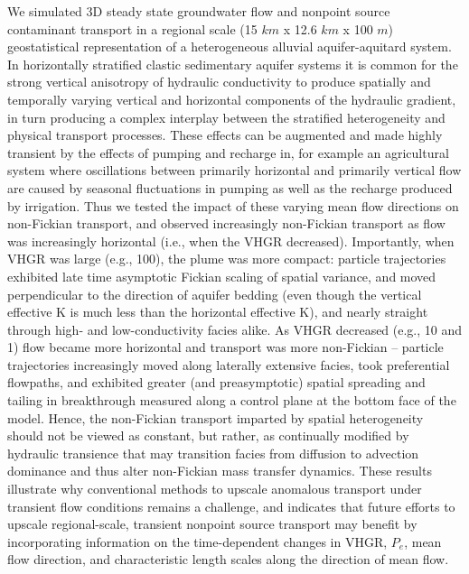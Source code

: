 We simulated 3D steady state groundwater flow and nonpoint source contaminant transport in a regional scale (15 $km$ x 12.6 $km$ x 100 $m$) geostatistical representation of a heterogeneous alluvial aquifer-aquitard system. In horizontally stratified clastic sedimentary aquifer systems it is common for the strong vertical anisotropy of hydraulic conductivity to produce spatially and temporally varying vertical and horizontal components of the hydraulic gradient, in turn producing a complex interplay between the stratified heterogeneity and physical transport processes. These effects can be augmented and made highly transient by the effects of pumping and recharge in, for example an agricultural system where oscillations between primarily horizontal and primarily vertical flow are caused by seasonal fluctuations in pumping as well as the recharge produced by irrigation. Thus we tested the impact of these varying mean flow directions on non-Fickian transport, and observed increasingly non-Fickian transport as flow was increasingly horizontal (i.e., when the VHGR decreased). Importantly, when VHGR was large (e.g., 100), the plume was more compact: particle trajectories exhibited late time asymptotic Fickian scaling of spatial variance, and moved perpendicular to the direction of aquifer bedding (even though the vertical effective K is much less than the horizontal effective K), and nearly straight through high- and low-conductivity facies alike. As VHGR decreased (e.g., 10 and 1) flow became more horizontal and transport was more non-Fickian -- particle trajectories increasingly moved along laterally extensive facies, took preferential flowpaths, and exhibited greater (and preasymptotic) spatial spreading and tailing in breakthrough measured along a control plane at the bottom face of the model. Hence, the non-Fickian transport imparted by spatial heterogeneity should not be viewed as constant, but rather, as continually modified by hydraulic transience that may transition facies from diffusion to advection dominance and thus alter non-Fickian mass transfer dynamics. These results illustrate why conventional methods to upscale anomalous transport under transient flow conditions remains a challenge, and indicates that future efforts to upscale regional-scale, transient nonpoint source transport may benefit by incorporating information on the time-dependent changes in VHGR, $P_e$, mean flow direction, and characteristic length scales along the direction of mean flow.


\clearpage
